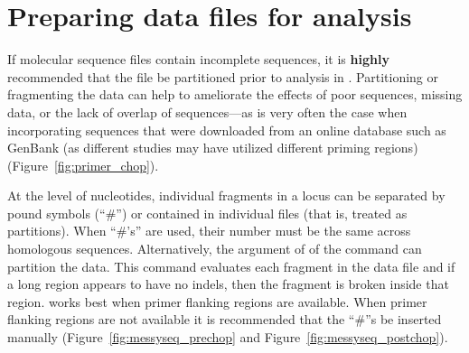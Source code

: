 \section{Preparing data files for analysis}
If molecular sequence files contain incomplete sequences, it is {\bf highly}
recommended that the file be partitioned prior to analysis in \poy.
Partitioning or fragmenting the data can help to ameliorate the effects of
poor sequences, missing data, or the lack of overlap of sequences---as
is very often the case when incorporating sequences that were downloaded 
from an online database such as GenBank (as different studies may have 
utilized different priming regions) (Figure~\ref{fig:primer_chop}).

At the level of nucleotides, individual fragments in a locus can
be separated by pound symbols (``\#'') or contained in individual
files (that is, treated as partitions). When ``\#'s'' are used,
their number must be the same across homologous sequences.
Alternatively, the argument of 
of the command  can partition the data. This
command evaluates each fragment in the data file and if a long
region appears to have no indels, then the fragment is broken inside
that region.  works best
when primer flanking regions are available. When primer flanking 
regions are not available it is recommended that 
the ``\#''s be inserted manually (Figure~\ref{fig:messyseq_prechop} and 
Figure~\ref{fig:messyseq_postchop}).

